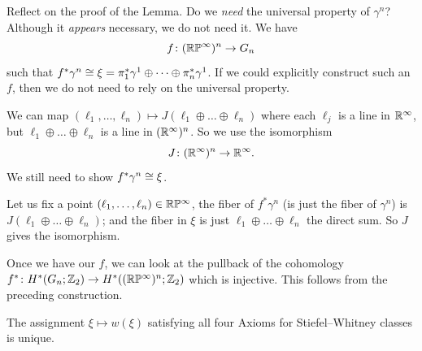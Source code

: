 \begin{remark}
Reflect on the proof of the Lemma.
Do we \emph{need} the universal property of $\gamma^{n}$?
Although it \emph{appears} necessary, we do not need it. We have
\begin{equation}
f\colon(\mathbb{R}\mathbb{P}^{\infty})^{n}\to G_{n}
\end{equation}
such that $f^{*}\gamma^{n}\cong\xi=\pi_{1}^{*}\gamma^{1}\oplus\dots\oplus\pi_{n}^{*}\gamma^{1}$.
If we could explicitly construct such an $f$, then we do not need to
rely on the universal property.

We can map $(\ell_{1},\dots,\ell_{n})\mapsto J(\ell_{1}\oplus\dots\oplus\ell_{n})$
where each $\ell_{j}$ is a line in $\mathbb{R}^{\infty}$, but
$\ell_{1}\oplus\dots\oplus\ell_{n}$ is a line in
$(\mathbb{R}^{\infty})^{n}$. So we use the isomorphism
\begin{equation}
J\colon(\mathbb{R}^{\infty})^{n}\to\mathbb{R}^{\infty}.
\end{equation}
We still need to show $f^{*}\gamma^{n}\cong\xi$.

Let us fix a point $(\ell_{1},\dots,\ell_{n})\in\mathbb{R}\mathbb{P}^{\infty}$, the
fiber of $f^{*}\gamma^{n}$ (is just the fiber of $\gamma^{n}$) is
$J(\ell_{1}\oplus\dots\oplus\ell_{n})$; and the fiber in $\xi$ is just
$\ell_{1}\oplus\dots\oplus\ell_{n}$ the direct sum. So $J$ gives the
isomorphism.

Once we have our $f$, we can look at the pullback of the cohomology
$f^{*}\colon H^{*}(G_{n};\mathbb{Z}_{2})\to
H^{*}((\mathbb{R}\mathbb{P}^{\infty})^{n};\mathbb{Z}_{2})$ which is injective. This follows
from the preceding construction.
\end{remark}

\begin{theorem}
The assignment $\xi\mapsto w(\xi)$ satisfying all four Axioms for
Stiefel--Whitney classes is unique.
\end{theorem}

